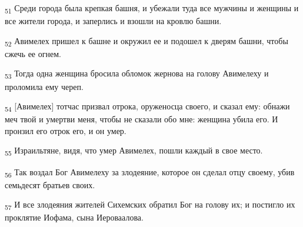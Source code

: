 \begin{tcolorbox}
\textsubscript{51} Среди города была крепкая башня, и убежали туда все мужчины и женщины и все жители города, и заперлись и взошли на кровлю башни.
\end{tcolorbox}
\begin{tcolorbox}
\textsubscript{52} Авимелех пришел к башне и окружил ее и подошел к дверям башни, чтобы сжечь ее огнем.
\end{tcolorbox}
\begin{tcolorbox}
\textsubscript{53} Тогда одна женщина бросила обломок жернова на голову Авимелеху и проломила ему череп.
\end{tcolorbox}
\begin{tcolorbox}
\textsubscript{54} [Авимелех] тотчас призвал отрока, оруженосца своего, и сказал ему: обнажи меч твой и умертви меня, чтобы не сказали обо мне: женщина убила его. И пронзил его отрок его, и он умер.
\end{tcolorbox}
\begin{tcolorbox}
\textsubscript{55} Израильтяне, видя, что умер Авимелех, пошли каждый в свое место.
\end{tcolorbox}
\begin{tcolorbox}
\textsubscript{56} Так воздал Бог Авимелеху за злодеяние, которое он сделал отцу своему, убив семьдесят братьев своих.
\end{tcolorbox}
\begin{tcolorbox}
\textsubscript{57} И все злодеяния жителей Сихемских обратил Бог на голову их; и постигло их проклятие Иофама, сына Иероваалова.
\end{tcolorbox}
